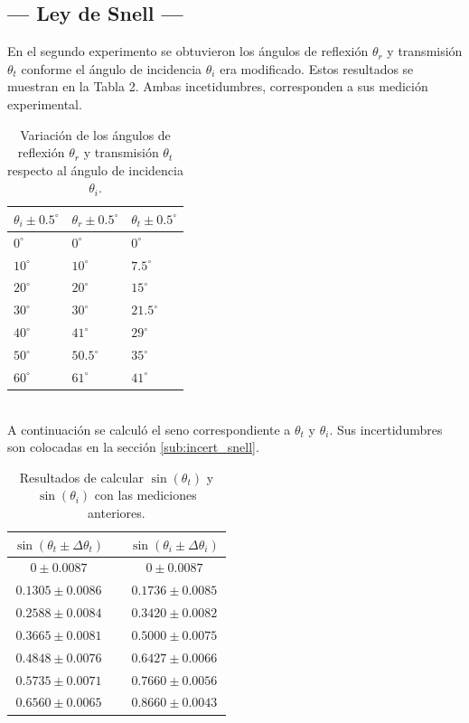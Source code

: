 \documentclass[12pt,a4paper]{article}
\begin{document}
\subsection{--- Ley de Snell ---} %
\label{sub:ley_snell_resul}
En el segundo experimento se obtuvieron los ángulos de reflexión $\theta_r$ y transmisión $\theta_t$ conforme el ángulo de incidencia $\theta_i$ era modificado. Estos resultados se muestran en la Tabla 2. Ambas incetidumbres, corresponden a sus medición experimental.
\begin{table}[ht]
	\centering
	\caption{Variación de los ángulos de reflexión $\theta_r$ y transmisión $\theta_t$ respecto al ángulo de incidencia $\theta_i$.}
	\begin{tabular}{*{3}{l}}
		\hline
		$\theta_i\pm0.5^{\circ}$ & $\theta_r\pm0.5^{\circ}$ & $\theta_t\pm0.5^{\circ}$ \\ \hline 
     \(0^ \circ \)  & \(0^ \circ \)    &  \(0^ \circ \) \\ \hline 
		\(10^ \circ \) & \(10^ \circ \)   & \(7.5^ \circ \) \\ \hline 
		\(20^ \circ \) & \(20^ \circ \)   &  \(15^ \circ \) \\ \hline 
		\(30^ \circ \) & \(30^ \circ \)   &\(21.5^ \circ \) \\ \hline 
		\(40^ \circ \) & \(41^ \circ \)   &  \(29^ \circ \) \\ \hline 
		\(50^ \circ \) & \(50.5^ \circ \) &  \(35^ \circ \) \\ \hline 
		\(60^ \circ \) & \(61^ \circ \)   &  \(41^ \circ \) \\ \hline 
	\end{tabular}
	\label{tab:exp2}
\end{table}\\
A continuación se calculó el seno correspondiente a $\theta_t$ y $\theta_i$. Sus incertidumbres son colocadas en la sección \ref{sub:incert_snell}.
\begin{table}[ht]
	\centering
	\caption{Resultados de calcular $\sin(\theta_t)$ y $\sin(\theta_i)$ con las mediciones anteriores.}
	\begin{tabular}{ccc}
		\hline
		$\sin(\theta_t\pm\Delta\theta_t)$ && $\sin(\theta_i\pm\Delta\theta_i)$ \\
		\hline
		$0\pm0.0087$ && $0\pm0.0087$ \\
		\hline
		$0.1305\pm0.0086$ && $0.1736\pm0.0085$ \\
		\hline
		$0.2588\pm0.0084$ && $0.3420\pm0.0082$ \\
		\hline
		$0.3665\pm0.0081$ && $0.5000\pm0.0075$ \\
		\hline
		$0.4848\pm0.0076$ && $0.6427\pm0.0066$ \\
		\hline
		$0.5735\pm0.0071$ && $0.7660\pm0.0056$ \\
		\hline
		$0.6560\pm0.0065$ && $0.8660\pm0.0043$ \\
		\hline
	\end{tabular}
	\label{tab:senos}
\end{table}\\
\end{document}
